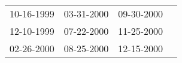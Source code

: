 \begin{supertabular}{llll}
 10-16-1999 &  03-31-2000 &  09-30-2000 \\
 12-10-1999 &  07-22-2000 &  11-25-2000 \\
 02-26-2000 &  08-25-2000 &  12-15-2000 \\
\end{supertabular}
